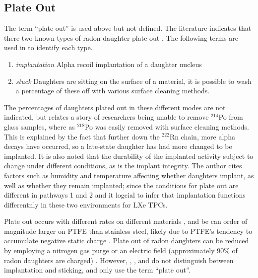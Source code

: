 
\subsection{Plate Out}
The term ``plate out'' is used above but not defined. The literature indicates that there two known types of radon daughter plate out \cite{Samuelsson1996}. The following terms are used in  \cite{Samuelsson1996} to identify each type.

\begin{enumerate}
\item \textit{implantation} Alpha recoil implantation of a daughter nucleus
\item \textit{stuck} Daughters are sitting on the surface of a material, it is possible to wash a percentage of these off with various surface cleaning methods.
\end{enumerate}

The percentages of daughters plated out in these different modes are not indicated, but \cite{Samuelsson1996} relates a story of researchers being unable to remove $^{214}$Po from glass samples, where as $^{218}$Po was easily removed with surface cleaning methods. This is explained by the fact that further down the $^{222}$Rn chain, more alpha decays have occurred, so a late-state daughter has had more changed to be implanted. It is also noted that the  durability of the implanted activity subject to change under different conditions, as is the implant integrity. The author cites factors such as humidity and temperature affecting whether daughters implant, as well as whether they remain implanted; since the conditions for plate out are different in pathways 1 and 2 and it logcial to infer that implantation functions differentnly in these two environments for \ac{LXe} \ac{TPC}s. 

Plate out occurs with different rates on different materials \cite{Bigu1987}, and be can order of magnitude larger on PTFE than stainless steel, likely due to PTFE's tendency to accumulate negative static charge \cite{Morrison2017}. Plate out of radon daughters can be reduced by employing a nitrogen gas purge or an electric field (approximately 90\% of radon daughters are charged) \cite{Bruemmer2015}. However, \cite{Bigu1987}, \cite{Morrison2017}, and \cite{Bruemmer2015} do not distinguish between implantation and sticking, and only use the term ``plate out''. 



